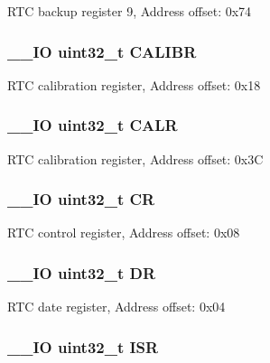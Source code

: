 R\-T\-C backup register 9, Address offset\-: 0x74 \hypertarget{struct_r_t_c___type_def_ab97f3e9584dda705dc10a5f4c5f6e636}{
\subsubsection[{C\-A\-L\-I\-B\-R}]{\setlength{\rightskip}{0pt plus 5cm}\-\_\-\-\_\-\-I\-O uint32\-\_\-t C\-A\-L\-I\-B\-R}}\label{struct_r_t_c___type_def_ab97f3e9584dda705dc10a5f4c5f6e636}
R\-T\-C calibration register, Address offset\-: 0x18 \hypertarget{struct_r_t_c___type_def_a2ce7c3842792c506635bb87a21588b58}{
\subsubsection[{C\-A\-L\-R}]{\setlength{\rightskip}{0pt plus 5cm}\-\_\-\-\_\-\-I\-O uint32\-\_\-t C\-A\-L\-R}}\label{struct_r_t_c___type_def_a2ce7c3842792c506635bb87a21588b58}
R\-T\-C calibration register, Address offset\-: 0x3\-C \hypertarget{struct_r_t_c___type_def_ab40c89c59391aaa9d9a8ec011dd0907a}{
\subsubsection[{C\-R}]{\setlength{\rightskip}{0pt plus 5cm}\-\_\-\-\_\-\-I\-O uint32\-\_\-t C\-R}}\label{struct_r_t_c___type_def_ab40c89c59391aaa9d9a8ec011dd0907a}
R\-T\-C control register, Address offset\-: 0x08 \hypertarget{struct_r_t_c___type_def_a3df0d8dfcd1ec958659ffe21eb64fa94}{
\subsubsection[{D\-R}]{\setlength{\rightskip}{0pt plus 5cm}\-\_\-\-\_\-\-I\-O uint32\-\_\-t D\-R}}\label{struct_r_t_c___type_def_a3df0d8dfcd1ec958659ffe21eb64fa94}
R\-T\-C date register, Address offset\-: 0x04 \hypertarget{struct_r_t_c___type_def_ab3c49a96815fcbee63d95e1e74f20e75}{
\subsubsection[{I\-S\-R}]{\setlength{\rightskip}{0pt plus 5cm}\-\_\-\-\_\-\-I\-O uint32\-\_\-t I\-S\-R}}\label{struct_r_t_c___type_def_ab3c49a96815fcbee63d95e1e74f20e75}
